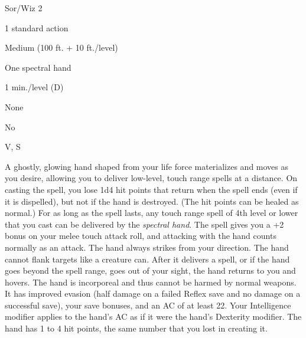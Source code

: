 
\begin{description*}
\item[Level:] Sor/Wiz 2
\item[Casting Time:] 1 standard action
\item[Range:] Medium (100 ft. + 10 ft./level)
\item[Effect:] One spectral hand
\item[Duration:] 1 min./level (D)
\item[Saving Throw:] None
\item[Spell Resistance:] No
\item[Components:] V, S
\end{description*}

A ghostly, glowing hand shaped from your life force materializes and moves as you
desire, allowing you to deliver low-level, touch range spells at a distance. On
casting the spell, you lose 1d4 hit points that return when the spell ends (even
if it is dispelled), but not if the hand is destroyed. (The hit points can be healed
as normal.) For as long as the spell lasts, any touch range spell of 4th level
or lower that you cast can be delivered by the \textit{spectral hand}. The spell
gives you a +2 bonus on your melee touch attack roll, and attacking with the hand
counts normally as an attack. The hand always strikes from your direction. The
hand cannot flank targets like a creature can. After it delivers a spell, or if
the hand goes beyond the spell range, goes out of your sight, the hand returns
to you and hovers.
The hand is incorporeal and thus cannot be harmed by normal weapons. It has improved
evasion (half damage on a failed Reflex save and no damage on a successful save),
your save bonuses, and an AC of at least 22. Your Intelligence modifier applies
to the hand's AC as if it were the hand's Dexterity modifier. The hand has 1 to
4 hit points, the same number that you lost in creating it.